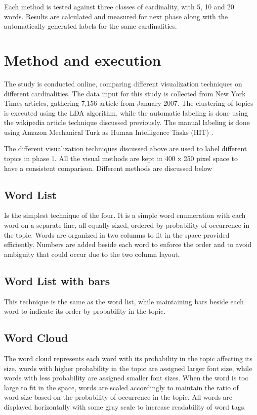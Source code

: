 \newParagraph
Each method is tested against three classes of cardinality, with 5, 10 and 20 words. Results are calculated and measured for next phase along with the automatically
generated labels for the same cardinalities.

\section{Method and execution}
\label{sec:method}

The study is conducted online, comparing different visualization techniques on different cardinalities. The data input for this study is collected from New
 York Times articles, gathering 7,156 article from January 2007. The clustering of topics is executed using the LDA algorithm, while the automatic labeling
 is done using the wikipedia article technique discussed previously. The manual labeling is done using Amazon Mechanical Turk as  Human Intelligence Tasks (HIT)
 .

\newParagraph
The different visualization techniques discussed above are used to label different topics in phase 1. All the visual methods are kept in 400 x 250 pixel space
to have a consistent comparison. Different methods are discussed below

\subsection{Word List}
Is the simplest technique of the four. It is a simple word enumeration with each word on a separate line, all equally sized, ordered by probability of occurrence
in the topic. Words are organized in two columns to fit in the space provided efficiently. Numbers are added beside each word to enforce the order and to avoid
ambiguity that could occur due to the two column layout.

\subsection{Word List with bars}
This technique is the same as the word list, while maintaining bars beside each word to indicate its order by probability in the topic.

\subsection{Word Cloud}
The word cloud represents each word with its probability in the topic affecting its size, words with higher probability in the topic are assigned larger font
size, while words with less probability are assigned smaller font sizes. When the word is too large to fit in the space, words are scaled accordingly to maintain
the ratio of word size based on the probability of occurrence in the topic. All words are displayed horizontally with some gray scale to increase readability of
word tags.

